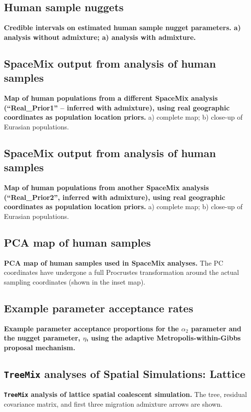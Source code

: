 \documentclass[10pt,letterpaper]{article}
\begin{document}
\subsection*{Human sample nuggets}
\label{globe_nuggs}
{\bf{Credible intervals on estimated human sample nugget parameters. a) analysis without admixture; a) analysis with admixture.}}

\subsection*{SpaceMix output from analysis of human samples}
\label{globe_ad_maps_realpr2}
{\bf{Map of human populations from a different SpaceMix analysis (``Real\_Prior1'' -- inferred with admixture), using real geographic coordinates as population location priors.}} a) complete map; b) close-up of Eurasian populations.

\subsection*{SpaceMix output from analysis of human samples}
\label{globe_ad_maps_realpr3}
{\bf{Map of human populations from another SpaceMix analysis (``Real\_Prior2'',  inferred with admixture), using real geographic coordinates as population location priors.}}  a) complete map; b) close-up of Eurasian populations.

\subsection*{PCA map of human samples}
\label{globe_PCA_map}
{\bf{PCA map of human samples used in SpaceMix analyses.}} The PC coordinates have undergone a full Procrustes transformation around the actual sampling coordinates (shown in the inset map).

\subsection*{Example parameter acceptance rates}
\label{example_acceptance_rates}
{\bf{Example parameter acceptance proportions for the $\alpha_2$ parameter and the nugget parameter, $\eta$, using the adaptive Metropolis-within-Gibbs proposal mechanism.}}

\subsection*{\texttt{TreeMix} analyses of Spatial Simulations: Lattice}
\label{treemix_lattice}
{\bf{\texttt{TreeMix} analysis of lattice spatial coalescent simulation.}}  
The tree, residual covariance matrix, and first three migration admixture arrows are shown.
\end{document}
